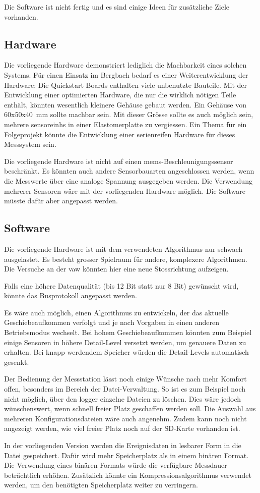 Die Software ist nicht fertig und es sind einige Ideen für zusätzliche Ziele vorhanden.

\subsection{Hardware}
Die vorliegende Hardware demonstriert lediglich die Machbarkeit eines solchen Systems. Für einen Einsatz im Bergbach bedarf es einer Weiterentwicklung der Hardware: Die Quickstart Boards enthalten viele unbenutzte Bauteile. Mit der Entwicklung einer optimierten Hardware, die nur die wirklich nötigen Teile enthält, könnten wesentlich kleinere Gehäuse gebaut werden. Ein Gehäuse von 60x50x40~mm sollte machbar sein. Mit dieser Grösse sollte es auch möglich sein, mehrere \glspl{sensoreinh} in einer Elastomerplatte zu vergiessen. Ein Thema für ein Folgeprojekt könnte die Entwicklung einer serienreifen Hardware für dieses Messsystem sein.

Die vorliegende Hardware ist nicht auf einen \gls{mems}-Beschleunigungssensor beschränkt. Es könnten auch andere Sensorbauarten angeschlossen werden, wenn die Messwerte über eine analoge Spannung ausgegeben werden. Die Verwendung mehrerer Sensoren wäre mit der vorliegenden Hardware möglich. Die Software müsste dafür aber angepasst werden.

\subsection{Software}
Die vorliegende Hardware ist mit dem verwendeten Algorithmus nur schwach ausgelastet. Es besteht grosser Spielraum für andere, komplexere Algorithmen. Die Versuche an der \gls{vaw} könnten hier eine neue Stossrichtung aufzeigen.

Falls eine höhere Datenqualität (bis 12 Bit statt nur 8 Bit) gewünscht wird, könnte das Busprotokoll angepasst werden.

Es wäre auch möglich, einen Algorithmus zu entwickeln, der das aktuelle Geschiebeaufkommen verfolgt und je nach Vorgaben in einen anderen Betriebsmodus wechselt. Bei hohem Geschiebeaufkommen könnten zum Beispiel einige Sensoren in höhere Detail-Level versetzt werden, um genauere Daten zu erhalten. Bei knapp werdendem Speicher würden die Detail-Levels automatisch gesenkt.

Der Bedienung der Messstation lässt noch einige Wünsche nach mehr Komfort offen, besonders im Bereich der Datei-Verwaltung. So ist es zum Beispiel noch nicht möglich, über den \gls{logger} einzelne Dateien zu löschen. Dies wäre jedoch wünschenswert, wenn schnell freier Platz geschaffen werden soll. Die Auswahl aus mehreren Konfigurationsdateien wäre auch angenehm. Zudem kann noch nicht angezeigt werden, wie viel freier Platz noch auf der SD-Karte vorhanden ist.

In der vorliegenden Version werden die Ereignisdaten in lesbarer Form in die Datei gespeichert. Dafür wird mehr Speicherplatz als in einem binären Format. Die Verwendung eines binären Formats würde die verfügbare Messdauer beträchtlich erhöhen. Zusätzlich könnte ein Kompressionsalgorithmus verwendet werden, um den benötigten Speicherplatz weiter zu verringern.
